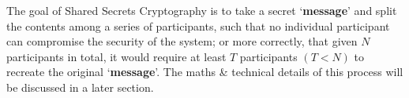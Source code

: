 \documentclass[11pt]{article} %
\def\ssc{Shared Secrets Cryptography\xspace}
\def\m{`{\bf message}'\xspace}
\begin{document}
The goal of \ssc is to take a secret \m and split the contents among a series of participants, such that no individual participant can compromise the security of the system; or more correctly, that given \(N\) participants in total, it would require at least \(T\) participants \(\left( T < N \right)\) to recreate the original \m. The maths \& technical details of this process will be discussed in a later section.

\begin{center}
\end{center}
\end{document}
